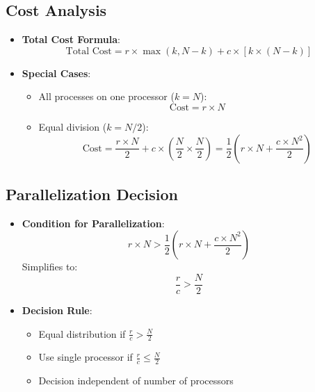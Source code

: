 \documentclass[12pt]{article}
\begin{document}
\subsection{Cost Analysis}
\begin{itemize}
\item \textbf{Total Cost Formula}:
  \[
  \text{Total Cost} = r \times \max(k, N-k) + c \times [k \times (N-k)]
  \]
  
\item \textbf{Special Cases}:
  \begin{itemize}
  \item All processes on one processor ($k = N$):
    \[
    \text{Cost} = r \times N
    \]
    
  \item Equal division ($k = N/2$):
    \[
    \text{Cost} = \frac{r \times N}{2} + c \times \left(\frac{N}{2} \times \frac{N}{2}\right) = \frac{1}{2}\left(r \times N + \frac{c \times N^2}{2}\right)
    \]
  \end{itemize}
\end{itemize}

\subsection{Parallelization Decision}
\begin{itemize}
\item \textbf{Condition for Parallelization}:
  \[
  r \times N > \frac{1}{2}\left(r \times N + \frac{c \times N^2}{2}\right)
  \]
  Simplifies to:
  \[
  \frac{r}{c} > \frac{N}{2}
  \]
  
\item \textbf{Decision Rule}:
  \begin{itemize}
  \item Equal distribution if $\frac{r}{c} > \frac{N}{2}$
  \item Use single processor if $\frac{r}{c} \leq \frac{N}{2}$
  \item Decision independent of number of processors
  \end{itemize}
\end{itemize}
\end{document}
